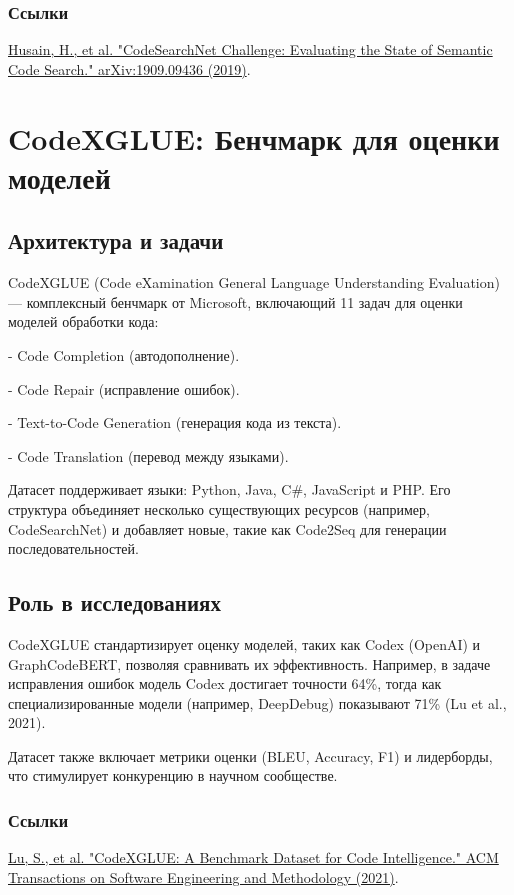 \documentclass[14pt]{article}
\theoremstyle{definition}
\begin{document}
\subsubsection*{Ссылки}
\href{https://arxiv.org/abs/1909.09436}{Husain, H., et al. "CodeSearchNet Challenge: Evaluating the State of Semantic Code Search." arXiv:1909.09436 (2019)}.

\newpage

\section{CodeXGLUE: Бенчмарк для оценки моделей}

\subsection{Архитектура и задачи}
CodeXGLUE (Code eXamination General Language Understanding Evaluation) — комплексный бенчмарк от Microsoft, включающий 11 задач для оценки моделей обработки кода:

    
- Code Completion (автодополнение).
    
- Code Repair (исправление ошибок).
    
- Text-to-Code Generation (генерация кода из текста).
    
- Code Translation (перевод между языками).


Датасет поддерживает языки: Python, Java, C\#, JavaScript и PHP. Его структура объединяет несколько существующих ресурсов (например, CodeSearchNet) и добавляет новые, такие как Code2Seq для генерации последовательностей.

\subsection{Роль в исследованиях}
CodeXGLUE стандартизирует оценку моделей, таких как Codex (OpenAI) и GraphCodeBERT, позволяя сравнивать их эффективность. Например, в задаче исправления ошибок модель Codex достигает точности 64\%, тогда как специализированные модели (например, DeepDebug) показывают 71\% (Lu et al., 2021).

Датасет также включает метрики оценки (BLEU, Accuracy, F1) и лидерборды, что стимулирует конкуренцию в научном сообществе.

\subsubsection*{Ссылки}
\href{https://dl.acm.org/doi/10.1145/3484577}{Lu, S., et al. "CodeXGLUE: A Benchmark Dataset for Code Intelligence." ACM Transactions on Software Engineering and Methodology (2021)}.
\end{document}
